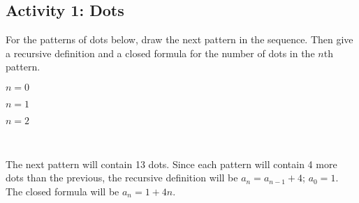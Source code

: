 \documentclass[11pt]{exam}
\def\v{circle (3pt)}
\begin{document}

\subsection*{Activity 1: Dots}

For the patterns of dots below, draw the next pattern in the sequence.  Then give a recursive definition and a closed formula for the number of dots in the $n$th pattern.


  \begin{multicols}{4}

\vspace*{\fill}


    \begin{center}


  $n = 0$
  \end{center}


  \columnbreak
\vspace*{\fill}


    \begin{center}

    $n = 1$
    \end{center}

    \columnbreak
    \vspace*{\fill}

    \begin{center}

    $n = 2$
    \end{center}

    \columnbreak
\vspace*{\fill}
	~
  \end{multicols}


  \begin{solution}
  The next pattern will contain 13 dots.  Since each pattern will contain 4 more dots than the previous, the recursive definition will be $a_n = a_{n-1} + 4$; $a_0 = 1$.  The closed formula will be $a_n = 1 + 4n$.
  \end{solution}
\end{document}
